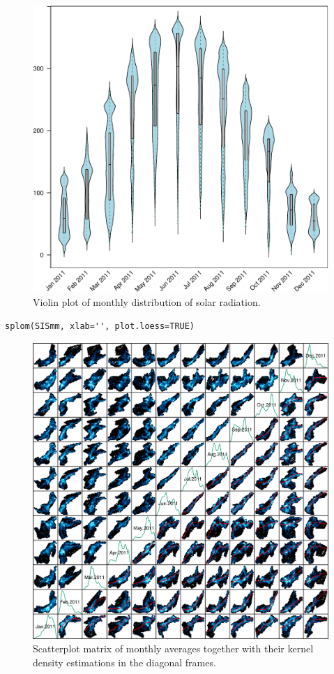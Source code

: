 \documentclass[smallroyalvopaper]{memoir}
\begin{document}
\begin{figure}[htb]
\centering
\includegraphics[width=.9\linewidth]{figs/SISdm_boxplot.pdf}
\caption{\label{fig:SISdm_boxplot}Violin plot of monthly distribution of solar radiation.}
\end{figure}


\lstset{language=R,numbers=none}
\begin{lstlisting}
splom(SISmm, xlab='', plot.loess=TRUE)
\end{lstlisting}

\begin{figure}[htb]
\centering
\includegraphics[width=.9\linewidth]{figs/SISmm_splom.png}
\caption{\label{fig:SISmm_splom}Scatterplot matrix of monthly averages together with their kernel density estimations in the diagonal frames.}
\end{figure}
\end{document}
